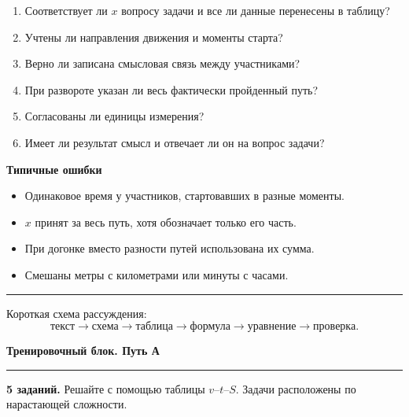 \documentclass[a4paper,12pt]{article}
\newcommand{\sectiontitle}[1]{%
  \Needspace{6\baselineskip}%
  \vspace{0.25em}%
  {\Large\bfseries\color{darkaccent}#1}\par
  \vspace{0.25em}%
  \textcolor{rulegray}{\rule{\linewidth}{0.6pt}}%
  \vspace{0.35em}%
}
\newcommand{\subsectiontitle}[1]{%
  \Needspace{4\baselineskip}%
  \vspace{0.45em}%
  {\large\bfseries\color{darkaccent}#1}\par
  \vspace{0.15em}%
}
\newcommand{\important}[1]{%
  \par\vspace{0.2em}%
  \noindent
  \textcolor{accent}{\rule{2.4pt}{\baselineskip}}%
  \hspace{0.65em}%
  \begin{minipage}[t]{0.94\linewidth}
  #1
  \end{minipage}%
  \par\vspace{0.3em}%
}
\begin{document}
\begin{enumerate}[itemsep=0.2em]
  \item Соответствует ли \(x\) вопросу задачи и все ли данные перенесены в таблицу?
  \item Учтены ли направления движения и моменты старта?
  \item Верно ли записана смысловая связь между участниками?
  \item При развороте указан ли весь фактически пройденный путь?
  \item Согласованы ли единицы измерения?
  \item Имеет ли результат смысл и отвечает ли он на вопрос задачи?
\end{enumerate}

\subsectiontitle{Типичные ошибки}

\begin{itemize}[itemsep=0.15em]
  \item Одинаковое время у участников, стартовавших в разные моменты.
  \item \(x\) принят за весь путь, хотя обозначает только его часть.
  \item При догонке вместо разности путей использована их сумма.
  \item Смешаны метры с километрами или минуты с часами.
\end{itemize}

\important{
Короткая схема рассуждения:
\[
\boxed{\text{текст}\to\text{схема}\to\text{таблица}\to\text{формула}\to\text{уравнение}\to\text{проверка}}.
\]
}

\clearpage
\sectiontitle{Тренировочный блок. Путь А}

\textbf{5 заданий.} Решайте с помощью таблицы \(v\)--\(t\)--\(S\).
Задачи расположены по нарастающей сложности.
\end{document}
